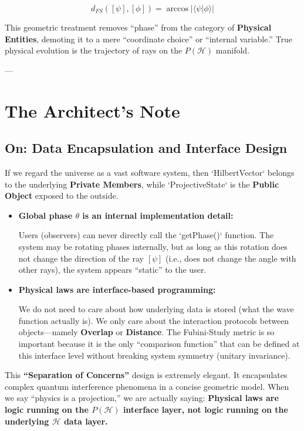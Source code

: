 \documentclass[11pt,a4paper,twoside]{book}
\begin{document}
$$d_{FS}([\psi], [\phi]) = \arccos |\langle \psi | \phi \rangle|$$

This geometric treatment removes ``phase'' from the category of \textbf{Physical Entities}, demoting it to a mere ``coordinate choice'' or ``internal variable.'' True physical evolution is the trajectory of rays on the $P(\mathcal{H})$ manifold.

---

\section{The Architect's Note}

\subsection{On: Data Encapsulation and Interface Design}

If we regard the universe as a vast software system, then `HilbertVector` belongs to the underlying \textbf{Private Members}, while `ProjectiveState` is the \textbf{Public Object} exposed to the outside.

\begin{itemize}
\item \textbf{Global phase $\theta$ is an internal implementation detail:}

    Users (observers) can never directly call the `getPhase()` function. The system may be rotating phases internally, but as long as this rotation does not change the direction of the ray $[\psi]$ (i.e., does not change the angle with other rays), the system appears ``static'' to the user.

\item \textbf{Physical laws are interface-based programming:}

    We do not need to care about how underlying data is stored (what the wave function actually is). We only care about the interaction protocols between objects---namely \textbf{Overlap} or \textbf{Distance}. The Fubini-Study metric is so important because it is the only ``comparison function'' that can be defined at this interface level without breaking system symmetry (unitary invariance).
\end{itemize}

This \textbf{``Separation of Concerns''} design is extremely elegant. It encapsulates complex quantum interference phenomena in a concise geometric model. When we say ``physics is a projection,'' we are actually saying: \textbf{Physical laws are logic running on the $P(\mathcal{H})$ interface layer, not logic running on the underlying $\mathcal{H}$ data layer.}
\end{document}
